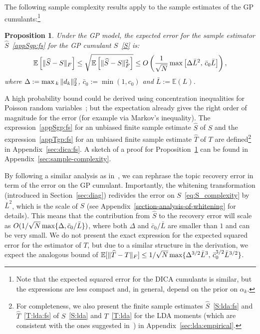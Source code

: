 \documentclass{article}
\newtheorem{proposition}{Proposition}[section]
\def\max{\mathop{\rm max}\limits}
\newcommand{\normp}[1]{\|#1\|}
\newcommand{\rbra}[1]{\left(#1\right)}
\newcommand{\sbra}[1]{\left[#1\right]}
\newcommand{\wh}[1]{\widehat{#1}}
\newcommand{\ebb}{\mathbb{E}}
\begin{document}
The following sample complexity results apply to the sample estimates of the GP cumulants:\footnote{Note that the expected squared error for the DICA cumulants is similar, but the expressions are less compact and, in general, depend on the prior on $\alpha_k$.}
\begin{proposition}\label{sample-complexity}
Under the GP model, the expected error for the sample estimator $\wh{S}$~\eqref{appSgp:fs} for the GP cumulant $S$~\eqref{S} is:
\begin{equation} \label{eq:S_complexity}
\ebb\sbra{ \normp{ \wh{S} - S }_F }  \leq 
\sqrt{\ebb\sbra{ \normp{ \wh{S} - S }_F^2 }}  \le O\rbra{ \frac{1}{\sqrt{N}}  \max\sbra{ \Delta \bar{L}^2,\,\bar{c}_0 \bar{L}  } } ,
\end{equation}
where $\Delta  := \max\mathop{}_k \normp{d_k}_2^2$, $\bar{c}_0 := \min(1,c_0)$ and $\bar{L} := \ebb(L)$.
\end{proposition}
A high probability bound could be derived using  concentration inequalities for  Poisson random variables~\cite{BouEtAl2013}; but the expectation already gives the right order of magnitude for the error (for example via Markov's inequality). 
The expression~\eqref{appSgp:fs} for an unbiased finite sample estimate $\wh{S}$ of $S$ and the expression~\eqref{appTgp:fs} for an unbiased finite sample estimate $\wh{T}$ of $T$ are defined\footnote{For completeness, we also present the finite sample estimates $\wh{S}$~\eqref{S:lda:fs} and $\wh{T}$~\eqref{T:lda:fs} of $S$~\eqref{S:lda} and $T$~\eqref{T:lda} for the LDA moments (which are consistent with the ones suggested in~\cite{AnaEtAl2014}) in Appendix~\ref{sec:lda:empirical}.
} 
in Appendix~\ref{sec:dica:fs}.
A sketch of a proof for Proposition~\ref{sample-complexity} can be found in Appendix~\ref{sec:sample-complexity}.

By following a similar analysis as in~\cite{AnaEtAl2013}, we can rephrase the topic recovery error in term of the error on the GP cumulant. Importantly, the whitening transformation (introduced in Section~\ref{sec:diag}) redivides the error on $S$~\eqref{eq:S_complexity} by $\bar{L}^2$, which is the scale of $S$ (see Appendix~\ref{section-analysis-of-whitening} for details). This means that the contribution from $\hat{S}$ to the recovery error will scale as $O({1}/{\sqrt{N}} \max\{\Delta, {\bar{c}_0}/{\bar{L}}\})$, where both $\Delta$ and ${\bar{c}_0}/{\bar{L}}$ are smaller than $1$ and can be very small. We do not present the exact expression for the expected squared error for the estimator of $T$, but due to a similar structure in the derivation, we expect the analogous bound of $\ebb[ \normp{ \wh{T} - T }_F ] \leq  {1}/{\sqrt{N}}\max\{ \Delta^{3/2} \bar{L}^3,\,\bar{c}_0^{3/2} \bar{L}^{3/2}  \}$.
\end{document}

